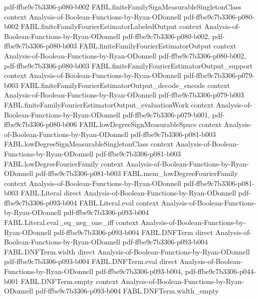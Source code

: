\begin{theorem}
  {pdf-ffbe9c7b3306-p080-b002}
\proofstep
  {FABL.finiteFamilySignMeasurableSingletonClass}
  {context}
  {Analysis-of-Boolean-Functions-by-Ryan-ODonnell}
  {pdf-ffbe9c7b3306-p080-b002}
\proofstep
  {FABL.finiteFamilyFourierEstimatorLabeledOutput}
  {context}
  {Analysis-of-Boolean-Functions-by-Ryan-ODonnell}
  {pdf-ffbe9c7b3306-p080-b002,
    pdf-ffbe9c7b3306-p080-b003}
\proofstep
  {FABL.finiteFamilyFourierEstimatorOutput}
  {context}
  {Analysis-of-Boolean-Functions-by-Ryan-ODonnell}
  {pdf-ffbe9c7b3306-p080-b002,
    pdf-ffbe9c7b3306-p080-b003}
\proofstep
  {FABL.finiteFamilyFourierEstimatorOutput_support}
  {context}
  {Analysis-of-Boolean-Functions-by-Ryan-ODonnell}
  {pdf-ffbe9c7b3306-p079-b003}
\proofstep
  {FABL.finiteFamilyFourierEstimatorOutput_decode_encode}
  {context}
  {Analysis-of-Boolean-Functions-by-Ryan-ODonnell}
  {pdf-ffbe9c7b3306-p079-b003}
\proofstep
  {FABL.finiteFamilyFourierEstimatorOutput_evaluationWork}
  {context}
  {Analysis-of-Boolean-Functions-by-Ryan-ODonnell}
  {pdf-ffbe9c7b3306-p079-b001,
    pdf-ffbe9c7b3306-p080-b006}
\proofstep
  {FABL.lowDegreeSignMeasurableSpace}
  {context}
  {Analysis-of-Boolean-Functions-by-Ryan-ODonnell}
  {pdf-ffbe9c7b3306-p081-b003}
\proofstep
  {FABL.lowDegreeSignMeasurableSingletonClass}
  {context}
  {Analysis-of-Boolean-Functions-by-Ryan-ODonnell}
  {pdf-ffbe9c7b3306-p081-b003}
\proofstep
  {FABL.lowDegreeFourierFamily}
  {context}
  {Analysis-of-Boolean-Functions-by-Ryan-ODonnell}
  {pdf-ffbe9c7b3306-p081-b003}
\proofstep
  {FABL.mem_lowDegreeFourierFamily}
  {context}
  {Analysis-of-Boolean-Functions-by-Ryan-ODonnell}
  {pdf-ffbe9c7b3306-p081-b003}
\proofstep
  {FABL.Literal}
  {direct}
  {Analysis-of-Boolean-Functions-by-Ryan-ODonnell}
  {pdf-ffbe9c7b3306-p093-b004}
\proofstep
  {FABL.Literal.eval}
  {context}
  {Analysis-of-Boolean-Functions-by-Ryan-ODonnell}
  {pdf-ffbe9c7b3306-p093-b004}
\proofstep
  {FABL.Literal.eval_eq_neg_one_iff}
  {context}
  {Analysis-of-Boolean-Functions-by-Ryan-ODonnell}
  {pdf-ffbe9c7b3306-p093-b004}
\proofstep
  {FABL.DNFTerm}
  {direct}
  {Analysis-of-Boolean-Functions-by-Ryan-ODonnell}
  {pdf-ffbe9c7b3306-p093-b004}
\proofstep
  {FABL.DNFTerm.width}
  {direct}
  {Analysis-of-Boolean-Functions-by-Ryan-ODonnell}
  {pdf-ffbe9c7b3306-p093-b004}
\proofstep
  {FABL.DNFTerm.eval}
  {direct}
  {Analysis-of-Boolean-Functions-by-Ryan-ODonnell}
  {pdf-ffbe9c7b3306-p093-b004,
    pdf-ffbe9c7b3306-p044-b001}
\proofstep
  {FABL.DNFTerm.empty}
  {context}
  {Analysis-of-Boolean-Functions-by-Ryan-ODonnell}
  {pdf-ffbe9c7b3306-p093-b004}
\proofstep
  {FABL.DNFTerm.width_empty}

\end{theorem}

